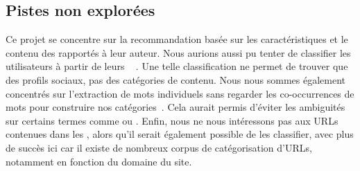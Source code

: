 \subsection{Pistes non explorées}

Ce projet se concentre sur la recommandation basée sur les caractéristiques et
le contenu des \tweets{} rapportés à leur auteur. Nous aurions aussi pu tenter
de classifier les utilisateurs à partir de leurs \tweets~
\citep{Pennacchiotti11}. Une telle classification ne permet de trouver que des
profils sociaux, pas des catégories de contenu. Nous nous sommes également
concentrés sur l’extraction de mots individuels sans regarder les
co-occurrences de mots pour construire nos
catégories~\citep{Ramage2010,Rigouste06}. Cela aurait permis d’éviter les
ambiguités sur certains termes comme  ou . Enfin, nous ne
nous intéressons pas aux URLs contenues dans les \tweets{}, alors qu’il serait
également possible de les classifier, avec plus de succès ici car il existe de
nombreux corpus de catégorisation d’URLs, notamment en fonction du domaine du
site.
